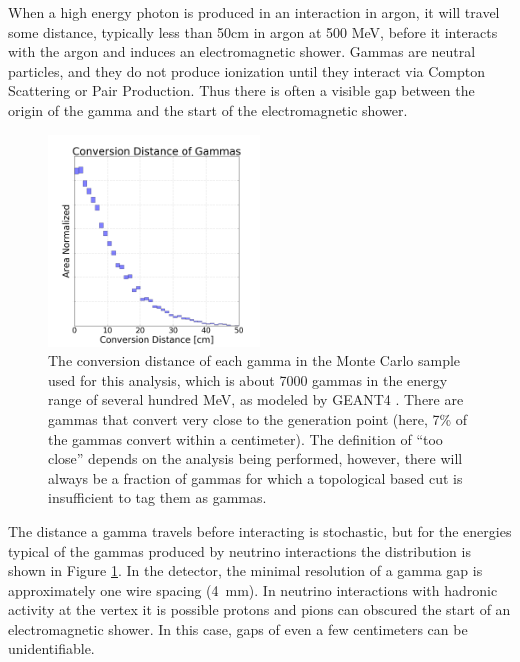 When a high energy photon is produced in an interaction in argon, it will travel some distance, typically less than 50cm in argon at 500 MeV, before it interacts with the argon and induces an electromagnetic shower.  Gammas are neutral particles, and they do not produce ionization until they interact via Compton Scattering or Pair Production. Thus there is often a visible gap between the origin of the gamma and the start of the electromagnetic shower. 

\begin{figure}[h!]
  \centering
  \includegraphics[width=0.5\textwidth]{emshower_figures/photon_conversion_dist.png}
  \caption[Photon Conversion Distance]{The conversion distance of each gamma in the Monte Carlo sample used for this analysis, which is about 7000 gammas in the energy range of several hundred MeV, as modeled by GEANT4 \cite{Agostinelli:2002hh}.  There are gammas that convert very close to the generation point (here, 7\% of the gammas convert within a centimeter).  The definition of ``too close'' depends on the analysis being performed, however, there will always be a fraction of gammas for which a topological based cut is insufficient to tag them as gammas. }
  \label{fig:photon_conversion_dist}
\end{figure}

The distance a gamma travels before interacting is stochastic, but for the energies typical of the gammas produced by neutrino interactions the distribution is shown in Figure \ref{fig:photon_conversion_dist}.  In the \argoneut detector, the minimal resolution of a gamma gap is approximately one wire spacing (4~mm). In neutrino interactions with hadronic activity at the vertex it is possible protons and pions can obscured the start of an electromagnetic shower.  In this case, gaps of even a few centimeters can be unidentifiable.

